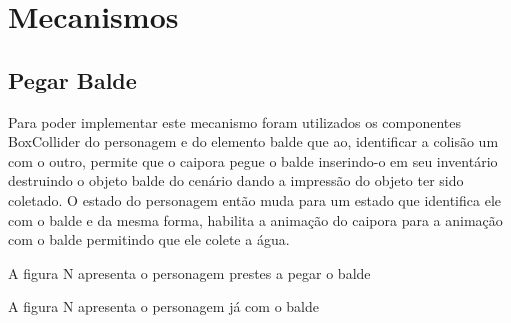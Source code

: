 \section{Mecanismos}


\subsection{Pegar Balde}
 Para poder implementar este mecanismo foram utilizados os componentes BoxCollider do personagem e do elemento balde que ao, identificar a colisão um com o outro, permite que o caipora pegue o balde inserindo-o em seu inventário destruindo o objeto balde do cenário dando a impressão do objeto ter sido coletado. O estado do personagem então muda para um estado que identifica ele com o balde e da mesma forma, habilita a animação do caipora para a animação com o balde permitindo que ele colete a água.

A figura N apresenta o personagem prestes a pegar o balde

\begin{figure}[h!]
		\centering
	\end{figure}
	
	
	
	A figura N apresenta o personagem já com o balde

\begin{figure}[h!]
		\centering
	\end{figure}
	
